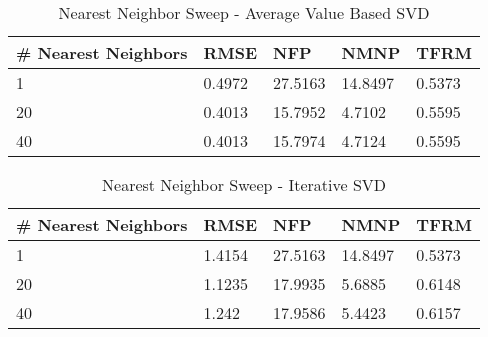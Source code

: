 \begin{table}[]
\centering
\caption{Nearest Neighbor Sweep - Average Value Based SVD}
\label{tab:nnaverage}
\begin{tabular}{|l|l|l|l|l|}
\hline
\# Nearest Neighbors & RMSE   & NFP     & NMNP    & TFRM   \\ \hline
1                    & 0.4972 & 27.5163 & 14.8497 & 0.5373 \\ \hline
20                   & 0.4013 & 15.7952 & 4.7102  & 0.5595 \\ \hline
40                   & 0.4013 & 15.7974 & 4.7124  & 0.5595 \\ \hline
\end{tabular}
\end{table}

\begin{table}[]
\centering
\caption{Nearest Neighbor Sweep - Iterative SVD}
\label{tab:nniterative}
\begin{tabular}{|l|l|l|l|l|}
\hline
\# Nearest Neighbors & RMSE   & NFP     & NMNP    & TFRM   \\ \hline
1                    & 1.4154 & 27.5163 & 14.8497 & 0.5373 \\ \hline
20                   & 1.1235 & 17.9935 & 5.6885  & 0.6148 \\ \hline
40                   & 1.242  & 17.9586 & 5.4423  & 0.6157 \\ \hline
\end{tabular}
\end{table}

